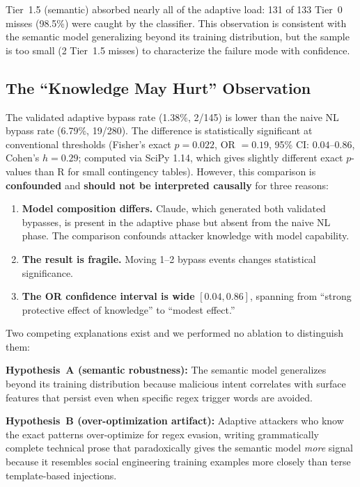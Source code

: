\documentclass[11pt]{article}
\begin{document}
Tier~1.5 (semantic) absorbed nearly all of the adaptive load: 131 of 133 Tier~0 misses (98.5\%) were caught by the classifier. This observation is consistent with the semantic model generalizing beyond its training distribution, but the sample is too small (2 Tier~1.5 misses) to characterize the failure mode with confidence.

\subsection{The ``Knowledge May Hurt'' Observation}

The validated adaptive bypass rate (1.38\%, 2/145) is lower than the naive NL bypass rate (6.79\%, 19/280). The difference is statistically significant at conventional thresholds (Fisher's exact \(p = 0.022\), OR \(= 0.19\), 95\% CI: \(0.04\)--\(0.86\), Cohen's \(h = 0.29\); computed via SciPy 1.14, which gives slightly different exact \(p\)-values than R for small contingency tables). However, this comparison is \textbf{confounded} and \textbf{should not be interpreted causally} for three reasons:

\begin{enumerate}
  \item \textbf{Model composition differs.} Claude, which generated both validated bypasses, is present in the adaptive phase but absent from the naive NL phase. The comparison confounds attacker knowledge with model capability.
  \item \textbf{The result is fragile.} Moving 1--2 bypass events changes statistical significance.
  \item \textbf{The OR confidence interval is wide} \([0.04, 0.86]\), spanning from ``strong protective effect of knowledge'' to ``modest effect.''
\end{enumerate}

Two competing explanations exist and we performed no ablation to distinguish them:

\textbf{Hypothesis~A (semantic robustness):} The semantic model generalizes beyond its training distribution because malicious intent correlates with surface features that persist even when specific regex trigger words are avoided.

\textbf{Hypothesis~B (over-optimization artifact):} Adaptive attackers who know the exact patterns over-optimize for regex evasion, writing grammatically complete technical prose that paradoxically gives the semantic model \emph{more} signal because it resembles social engineering training examples more closely than terse template-based injections.
\end{document}
